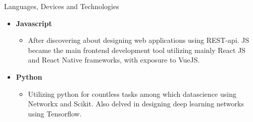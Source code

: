 \documentclass[]{mcdowellcv}
\begin{document}
	\begin{cvsection}{Languages, Devices and Technologies}
		\begin{cvsubsection}{}{}{}	
			\begin{itemize}
				\item \textbf{Javascript} 
				\begin{itemize}
					\item After discovering about designing web applications using REST-api. JS became the main frontend development tool utilizing mainly React JS and React Native frameworks, with exposure to VueJS.
				\end{itemize}
				\item \textbf{Python}
				\begin{itemize}
					\item Utilizing python for countless tasks among which datascience using Networkx and Scikit. Also delved in designing deep learning networks using Tensorflow. 
				\end{itemize}
				

\end{itemize}
\end{cvsubsection}
\end{cvsection}
\end{document}
